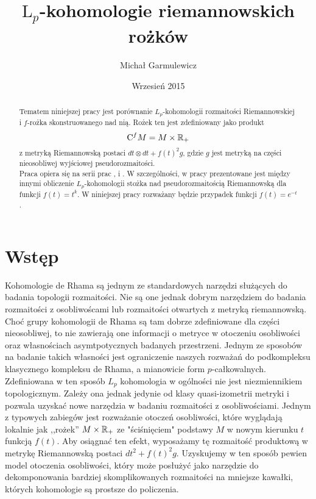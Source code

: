 \documentclass[licencjacka]{pracamgr}
\author{Michał Garmulewicz}
\title{$\mathrm{L}_p$-kohomologie riemannowskich rożków}
\date{Wrzesień 2015}
\theoremstyle{definition}
\theoremstyle{definition}
\theoremstyle{plain}
\theoremstyle{plain}
\theoremstyle{plain}
\theoremstyle{plain}
\theoremstyle{plain}
\def\cfm{\ensuremath\mathrm{C}^fM}
\def\M{\ensuremath M}
\def\R{\ensuremath\mathbb{R}}
\begin{document}
\maketitle

\begin{abstract}
    Tematem niniejszej pracy jest porównanie $L_p$-kohomologii
    rozmaitości Riemannowskiej i $f$-rożka skonstruowanego nad nią.
    Rożek ten jest zdefiniowany jako produkt 
    \[
    \cfm = \M \times \R_{+}
    \]
    z metryką Riemannowską postaci $dt \otimes dt + f(t)^2 g$, gdzie $g$ jest
    metryką na części nieosobliwej wyjściowej pseudorozmaitości. \\
    
    Praca opiera się na serii prac \cite{cheeger}, \cite{youssin} i \cite{weber}.
    W szczególności, w pracy \cite{weber} prezentowane jest między innymi
    obliczenie $L_p$-kohomologii stożka nad pseudorozmaitością Riemannowską dla
    funkcji $f(t) = t^k$. W niniejszej pracy rozważany będzie przypadek funkcji
    $f(t) = e^{-t}$. \\
\end{abstract}

\tableofcontents


\chapter{Wstęp}

Kohomologie de Rhama są jednym ze standardowych narzędzi służących do badania
topologii rozmaitości.  Nie są one jednak dobrym narzędziem do badania
rozmaitości z osobliwoścami lub rozmaitości otwartych z metryką riemannowską.
Choć grupy kohomologii de Rhama są tam dobrze zdefiniowane dla części
nieosobliwej, to nie zawierają one informacji o metryce w otoczeniu osobliwości
oraz własnościach asymtpotycznych badanych przestrzeni.  Jednym ze sposobów na
badanie takich własności jest ograniczenie naszych rozważań do podkompleksu
klasycznego kompleksu de Rhama, a mianowicie form $p$-całkowalnych.
Zdefiniowana w ten sposób $L_p$ kohomologia w ogólności nie jest niezmiennikiem
topologicznym.  Zależy ona jednak jedynie od klasy quasi-izometrii metryki i
pozwala uzyskać nowe narzędzia w badaniu rozmaitości z osobliwościami.  Jednym
z typowych zabiegów jest rozważanie otoczeń osobliwości, które wyglądają
lokalnie jak ,,rożek'' $\M \times \R_{+}$ ze "ściśnięciem" podstawy $M$ w nowym
kierunku $t$ funkcją $f(t)$. Aby osiągnać ten efekt,  wyposażamy tę rozmaitość
produktową w metrykę Riemannowską postaci $dt^2 + f(t)^2 g$.  Uzyskujemy w ten
sposób pewien model otoczenia osobliwości, który może posłużyć jako narzędzie
do dekomponowania bardziej skomplikowanych rozmaitości na mniejsze kawałki,
których kohomologie są prostsze do policzenia.  \\
\end{document}
